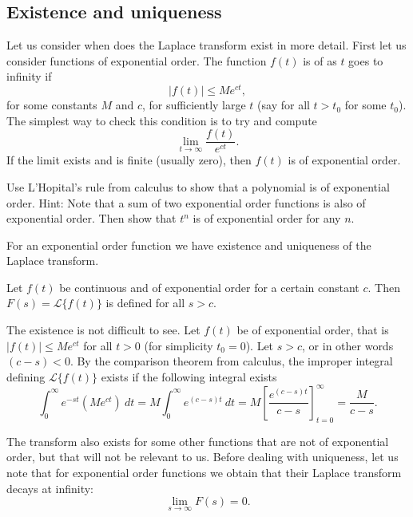 \subsection{Existence and uniqueness}

Let us consider when does the Laplace transform exist in more detail.  First
let us consider functions of exponential order.  The function $f(t)$ is of
\emph{} as $t$ goes to infinity if
\begin{equation*}
\lvert f(t) \rvert \leq M e^{ct} ,
\end{equation*}
for some constants $M$ and $c$, for
sufficiently large $t$ (say for all $t > t_0$ for some $t_0$).  The simplest
way to check this condition is to try and compute
\begin{equation*}
\lim_{t\to \infty} \frac{f(t)}{e^{ct}} .
\end{equation*}
If the limit exists and is finite (usually zero), then $f(t)$ is of
exponential order.

\begin{exercise}
Use L'Hopital's rule from calculus to show that a polynomial is of
exponential order.  Hint: Note that a sum of two exponential order functions
is also of exponential order.  Then show that $t^n$ is of exponential order
for any $n$.
\end{exercise}

For an exponential order function we have existence and uniqueness of the
Laplace transform.

\begin{theorem}[Existence]
Let $f(t)$ be continuous and of exponential order for a certain
constant $c$.  Then $F(s) = \mathcal{L} \bigl\{ f(t) \bigr\}$ is defined for
all $s > c$.
\end{theorem}

The existence is not difficult to see.  Let $f(t)$ be of exponential order,
that is $\lvert f(t) \rvert \leq M e^{ct}$ for all $t > 0$ (for simplicity $t_0 = 0$).
Let $s > c$, or in other words $(c-s) < 0$.
By the comparison theorem from calculus, the improper integral defining
$\mathcal{L} \bigl\{ f(t) \bigr\}$ exists if the following integral exists
\begin{equation*}
\int_0^\infty e^{-st} ( M e^{ct} ) ~dt
=
M \int_0^\infty e^{(c-s)t} ~dt = M \left[ \frac{e^{(c-s)t}}{c-s}
\right]_{t=0}^\infty = \frac{M}{c-s} .
\end{equation*}

The transform also exists for some other functions
that are not of exponential
order, but that will not be relevant to us.
Before dealing with uniqueness, let
us note that for exponential order functions we obtain that their
Laplace transform decays at infinity:
\begin{equation*}
\lim_{s\to\infty} F(s) = 0 .
\end{equation*}

